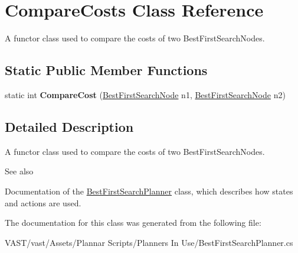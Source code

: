 \hypertarget{class_compare_costs}{\section{Compare\-Costs Class Reference}
\label{class_compare_costs}
}


A functor class used to compare the costs of two Best\-First\-Search\-Nodes.  


\subsection*{Static Public Member Functions}
\begin{DoxyCompactItemize}
\item 
\hypertarget{class_compare_costs_af4215b898ea435febd8e80eb2bac6c7e}{static int {\bfseries Compare\-Cost} (\hyperlink{class_best_first_search_node}{Best\-First\-Search\-Node} n1, \hyperlink{class_best_first_search_node}{Best\-First\-Search\-Node} n2)}\label{class_compare_costs_af4215b898ea435febd8e80eb2bac6c7e}

\end{DoxyCompactItemize}


\subsection{Detailed Description}
A functor class used to compare the costs of two Best\-First\-Search\-Nodes. 

\begin{DoxySeeAlso}{See also}

\begin{DoxyItemize}
\item Documentation of the \hyperlink{class_best_first_search_planner}{Best\-First\-Search\-Planner} class, which describes how states and actions are used. 
\end{DoxyItemize}
\end{DoxySeeAlso}


The documentation for this class was generated from the following file\-:\begin{DoxyCompactItemize}
\item 
V\-A\-S\-T/vast/\-Assets/\-Plannar Scripts/\-Planners In Use/Best\-First\-Search\-Planner.\-cs\end{DoxyCompactItemize}
